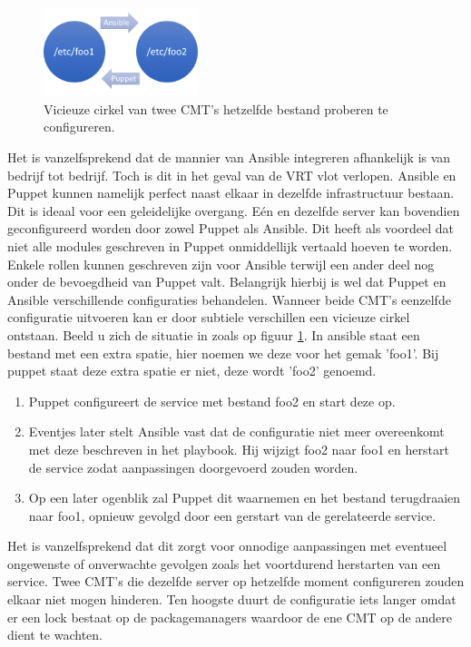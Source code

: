 \begin{figure}
\centering
\includegraphics[width=0.4\textwidth]{img/vicieuzecirkel.PNG}
\caption{\label{fig:vicieuzecirkel}Vicieuze cirkel van twee \gls{CMT}'s hetzelfde bestand proberen te configureren.}
\end{figure}

Het is vanzelfsprekend dat de mannier van Ansible integreren afhankelijk is van bedrijf tot bedrijf. Toch is dit in het geval van de VRT vlot verlopen. Ansible en Puppet kunnen namelijk perfect naast elkaar in dezelfde infrastructuur bestaan. Dit is ideaal voor een geleidelijke overgang. E\'en en dezelfde server kan bovendien geconfigureerd worden door zowel Puppet als Ansible. Dit heeft als voordeel dat niet alle modules geschreven in Puppet onmiddellijk vertaald hoeven te worden. Enkele rollen kunnen geschreven zijn voor Ansible terwijl een ander deel nog onder de bevoegdheid van Puppet valt. Belangrijk hierbij is wel dat Puppet en Ansible verschillende configuraties behandelen. Wanneer beide \gls{CMT}'s eenzelfde configuratie uitvoeren kan er door subtiele verschillen een vicieuze cirkel ontstaan.\newline
Beeld u zich de situatie in zoals op figuur \ref{fig:vicieuzecirkel}. In ansible staat een bestand met een extra spatie, hier noemen we deze voor het gemak 'foo1'. Bij puppet staat deze extra spatie er niet, deze wordt 'foo2' genoemd. 
\begin{enumerate}
\item Puppet configureert de service met bestand foo2 en start deze op.
\item  Eventjes later stelt Ansible vast dat de configuratie niet meer overeenkomt met deze beschreven in het playbook. Hij wijzigt foo2 naar foo1 en herstart de service zodat aanpassingen doorgevoerd zouden worden.
\item  Op een later ogenblik zal Puppet dit waarnemen en het bestand terugdraaien naar foo1, opnieuw gevolgd door een gerstart van de gerelateerde service.
\end{enumerate}
Het is vanzelfsprekend dat dit zorgt voor onnodige aanpassingen met eventueel ongewenste of onverwachte gevolgen zoals het voortdurend herstarten van een service.\newline
Twee \gls{CMT}'s die dezelfde server op hetzelfde moment configureren zouden elkaar niet mogen hinderen. Ten hoogste duurt de configuratie iets langer omdat er een lock bestaat op de \gls{packagemanager}s waardoor de ene \gls{CMT} op de andere dient te wachten.



